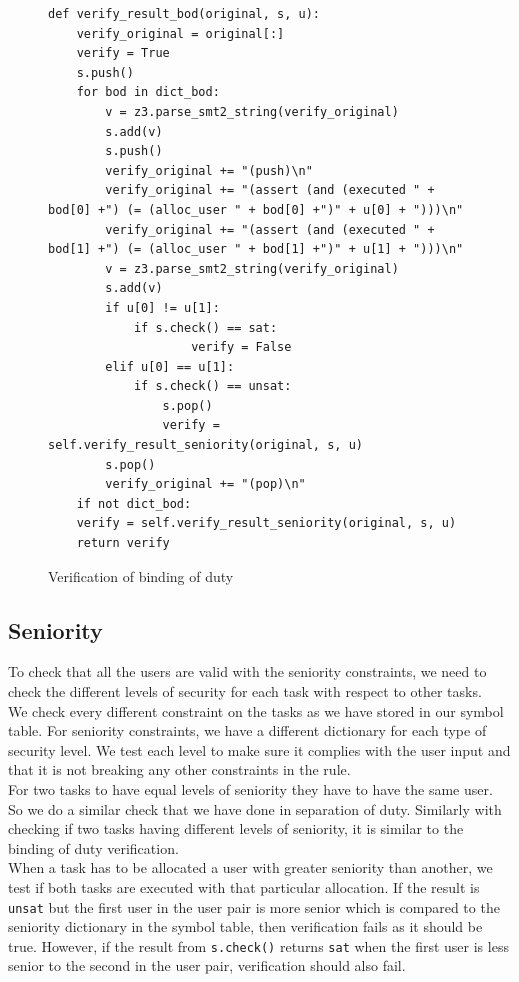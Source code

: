 \documentclass[a4paper]{report}
\begin{document}
\begin{figure}[!h]
\lstset{numbers=left, showspaces=false,
    showstringspaces=false, tabsize=2, breaklines=true,
    xleftmargin=5.0ex,
}
\begin{lstlisting}[frame=single]
def verify_result_bod(original, s, u):
	verify_original = original[:]
	verify = True
	s.push()
	for bod in dict_bod:
		v = z3.parse_smt2_string(verify_original)
		s.add(v)
		s.push()
		verify_original += "(push)\n"
		verify_original += "(assert (and (executed " + bod[0] +") (= (alloc_user " + bod[0] +")" + u[0] + ")))\n"
		verify_original += "(assert (and (executed " + bod[1] +") (= (alloc_user " + bod[1] +")" + u[1] + ")))\n"
		v = z3.parse_smt2_string(verify_original)
		s.add(v)
		if u[0] != u[1]:
			if s.check() == sat:
                    verify = False
		elif u[0] == u[1]:
			if s.check() == unsat:
				s.pop()
				verify = self.verify_result_seniority(original, s, u)
		s.pop()
		verify_original += "(pop)\n"
	if not dict_bod:
	verify = self.verify_result_seniority(original, s, u)
	return verify
\end{lstlisting}
\caption{Verification of binding of duty}
\label{fig:Verification of binding of duty}
\end{figure}

\newpage

\subsection{Seniority}
To check that all the users are valid with the seniority constraints, we need to check the different levels of security for each task with respect to other tasks. \\

We check every different constraint on the tasks as we have stored in our symbol table. For seniority constraints, we have a different dictionary for each type of security level. We test each level to make sure it complies with the user input and that it is not breaking any other constraints in the rule.\\

For two tasks to have equal levels of seniority they have to have the same user. So we do a similar check that we have done in separation of duty. Similarly with checking if two tasks having different levels of seniority, it is similar to the binding of duty verification. \\

When a task has to be allocated a user with greater seniority than another, we test if both tasks are executed with that particular allocation. If the result is \texttt{unsat} but the first user in the user pair is more senior which is compared to the seniority dictionary in the symbol table, then verification fails as it should be true. However, if the result from \texttt{s.check()} returns \texttt{sat} when the first user is less senior to the second in the user pair, verification should also fail. \\
\end{document}
